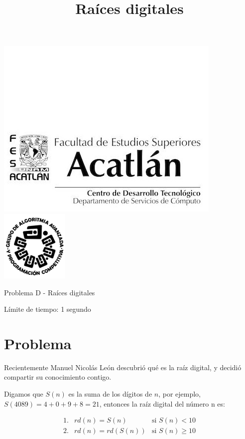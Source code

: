 \documentclass[letter,10pt]{article}
\date{}
\begin{document}
\title{Raíces digitales}

\includegraphics[scale=0.6]{logo} \hspace*{9.00cm}
\includegraphics[scale=0.5]{dsc} 
\bigskip
\begin{center}
    \Large Problema D - Raíces digitales
\end{center}

\begin{flushright}
Límite de tiempo: 1 segundo
\par\end{flushright}
\bigskip

\section*{Problema}

Recientemente Manuel Nicolás León descubrió qué es la raíz digital, y decidió compartir su conocimiento contigo.

Digamos que $S(n)$ es la suma de los dígitos de $n$, por ejemplo, $S(4089) = 4+0+9+8=21$, entonces la raíz digital del número n es:

$$\begin{array}{llr}
1. & rd(n)=S(n) & \mbox{si }S(n) < 10 \\
2. & rd(n) = rd(S(n)) & \mbox{si }S(n) \ge 10
\end{array}$$
\end{document}
